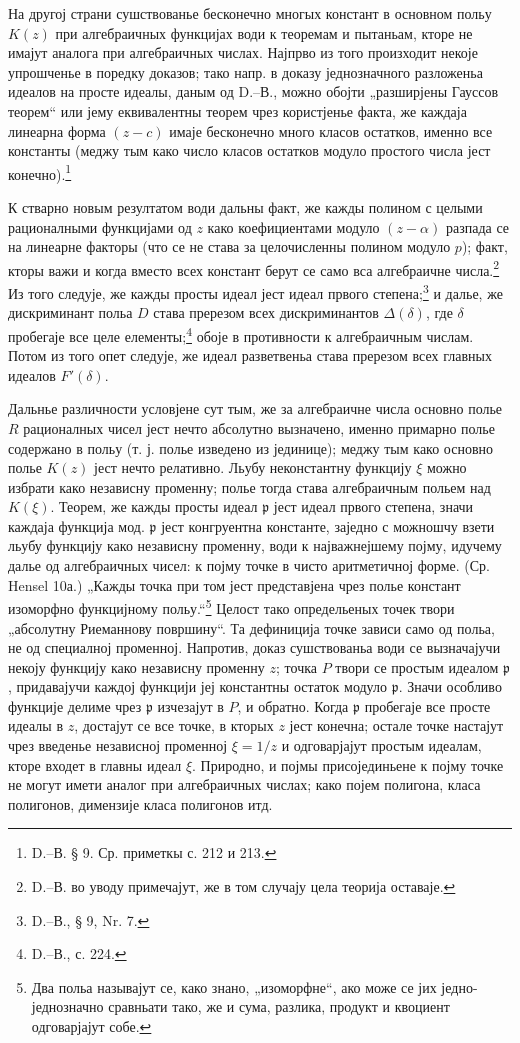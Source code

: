 ﻿\documentclass[11pt]{article}
\providecommand{\frp}{\mathfrak p}
\begin{document}
На другој страни сушствованье бесконечно многых констант в основном польу \(K(z)\) при алгебраичных функцијах води к теоремам и пытаньам, кторе не имајут аналога при алгебраичных числах. Најпрво из того произходит некоје упрошченье в поредку доказов; тако напр. в доказу једнозначного разложеньа идеалов на просте идеалы, даным од D.--В., можно обојти „разширјены Гауссов теорем“ или јему еквивалентны теорем чрез користјенье факта, же каждаја линеарна форма \((z-c)\) имаје бесконечно много класов остатков, именно все константы (меджу тым како число класов остатков модуло простого числа јест конечно).\footnote{D.--В. § 9. Ср. приметкы с. 212 и 213.}

К стварно новым резултатом води дальны факт, же кажды полином с целыми рационалными функцијами од \(z\) како коефициентами модуло \((z-\alpha)\) разпада се на линеарне факторы (что се не става за целочисленны полином модуло \(p\)); факт, кторы важи и когда вместо всех констант берут се само вса алгебраичне числа.\footnote{D.--В. во уводу примечајут, же в том случају цела теорија оставаје.} Из того следује, же кажды просты идеал јест идеал првого степена;\footnote{D.--В., § 9, Nr. 7.} и далье, же дискриминант польа \(D\) става пререзом всех дискриминантов \(\Delta(\delta)\), где \(\delta\) пробегаје все целе елементы;\footnote{D.--В., с. 224.} обоје в противности к алгебраичным числам. Потом из того опет следује, же идеал разветвеньа става пререзом всех главных идеалов \(F'(\delta)\).

Дальнье различности условјене сут тым, же за алгебраичне числа основно полье \(R\) рационалных чисел јест нечто абсолутно вызначено, именно примарно полье содержано в польу (т. ј. полье изведено из јединице); меджу тым како основно полье \(K(z)\) јест нечто релативно. Льубу неконстантну функцију \(\xi\) можно избрати како независну променну; полье тогда става алгебраичным польем над \(K(\xi)\). Теорем, же кажды просты идеал \(\frp\) јест идеал првого степена, значи каждаја функција мод. \(\frp\) јест конгруентна константе, заједно с можношчу взети льубу функцију како независну променну, води к најважнејшему појму, идучему далье од алгебраичных чисел: к појму точке в чисто аритметичној форме. (Ср. Hensel 10а.) „Кажды точка при том јест представјена чрез полье констант изоморфно функцијному польу.“\footnote{Два польа называјут се, како знано, „изоморфне“, ако може се јих једно-једнозначно сравньати тако, же и сума, разлика, продукт и квоциент одговарјајут собе.} Целост тако определьеных точек твори „абсолутну Риеманнову површину“. Та дефиниција точке зависи само од польа, не од специалној променној. Напротив, доказ сушствованьа води се вызначајучи некоју функцију како независну променну \(z\); точка \(P\) твори се простым идеалом \(\frp\), придавајучи каждој функцији јеј константны остаток модуло \(\frp\). Значи особливо функције делиме чрез \(\frp\) изчезајут в \(P\), и обратно. Когда \(\frp\) пробегаје все просте идеалы в \(z\), достајут се все точке, в кторых \(z\) јест конечна; остале точке настајут чрез введенье независној променној \(\xi=1/z\) и одговарјајут простым идеалам, кторе входет в главны идеал \(\xi\). Природно, и појмы присојединьене к појму точке не могут имети аналог при алгебраичных числах; како појем полигона, класа полигонов, димензије класа полигонов итд.
\end{document}
